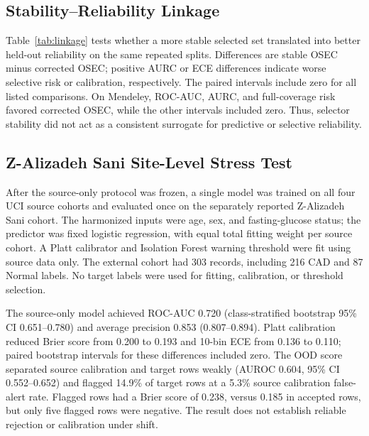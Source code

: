 \documentclass[12pt]{article}
\begin{document}
\begin{table}[t]
\centering
\caption{Post-boundary-corrected feature-selection stability. $\Phi$ is the
Nogueira chance-corrected stability statistic; intervals summarize the three
repeat-level paired differences and are exploratory.}
\label{tab:stability}

\end{table}

\subsection{Stability--Reliability Linkage}
Table~\ref{tab:linkage} tests whether a more stable selected set translated into
better held-out reliability on the same repeated splits. Differences are
stable OSEC minus corrected OSEC; positive AURC or ECE differences indicate
worse selective risk or calibration, respectively. The paired intervals include
zero for all listed comparisons. On Mendeley, ROC-AUC, AURC, and
full-coverage risk favored corrected OSEC, while the other intervals included
zero. Thus, selector stability did not act as a consistent surrogate for
predictive or selective reliability.

\begin{table}[t]
\centering
\caption{Paired stability--reliability linkage. $\Phi$ is cross-seed selected-
set stability. $\Delta$ values are stable OSEC minus corrected OSEC means; the
full bootstrap intervals are stored in the machine-readable linkage artifacts.}
\label{tab:linkage}

\end{table}

\subsection{Z-Alizadeh Sani Site-Level Stress Test}
After the source-only protocol was frozen, a single model was trained on all
four UCI source cohorts and evaluated once on the separately reported
Z-Alizadeh Sani cohort. The harmonized inputs were age, sex, and
fasting-glucose status;
the predictor was fixed logistic regression, with equal total fitting weight
per source cohort. A Platt calibrator and Isolation Forest warning threshold
were fit using source data only. The external cohort had 303 records, including
216 CAD and 87 Normal labels. No target labels were used for fitting,
calibration, or threshold selection.

The source-only model achieved ROC-AUC 0.720 (class-stratified bootstrap 95\%
CI 0.651--0.780) and average precision 0.853 (0.807--0.894). Platt calibration
reduced Brier score from 0.200 to 0.193 and 10-bin ECE from 0.136 to 0.110;
paired bootstrap intervals for these differences included zero. The OOD score
separated source calibration and target rows weakly (AUROC 0.604, 95\% CI
0.552--0.652) and flagged 14.9\% of target rows at a 5.3\% source calibration
false-alert rate. Flagged rows had a Brier score of 0.238, versus 0.185 in
accepted rows, but only five flagged rows were negative. The result does not
establish reliable rejection or calibration under shift.
\end{document}
